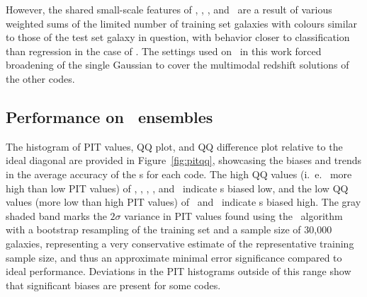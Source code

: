 However, the shared small-scale features of \annz, \metaphor, \cmnn, and \skynet\ are a result of various weighted sums of the limited number of training set galaxies with colours similar to those of the test set galaxy in question, with behavior closer to classification than regression in the case of \annz.
The settings used on \gpz\ in this work forced broadening of the single Gaussian to cover the multimodal redshift solutions of the other codes.

\subsection{Performance on \pzpdf\ ensembles}
\label{sec:pitqq}

The histogram of PIT values, QQ plot, and QQ difference plot relative to the ideal diagonal are provided in Figure~\ref{fig:pitqq}, showcasing the biases and trends in the average accuracy of the \pzpdf s for each code.
The high QQ values (i.~e.~ more high than low PIT values) of \bpz, \cmnn, \delight, \eazy, and \gpz\ indicate \pzpdf s biased low, and the low QQ values (more low than high PIT values) of \skynet\ and \tpz\ indicate \pzpdf s biased high.
The gray shaded band marks the $2\sigma$ variance in PIT values found using the \trainz\ algorithm with a bootstrap resampling of the training set and a sample size of 30,000 galaxies, representing a very conservative estimate of the representative training sample size, and thus an approximate minimal error significance compared to ideal performance.
Deviations in the PIT histograms outside of this range show that significant biases are present for some codes.

